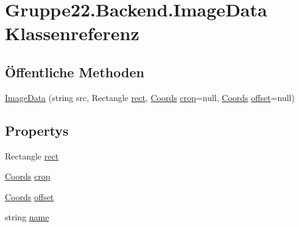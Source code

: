 \hypertarget{class_gruppe22_1_1_backend_1_1_image_data}{\section{Gruppe22.\-Backend.\-Image\-Data Klassenreferenz}
\label{class_gruppe22_1_1_backend_1_1_image_data}
}
\subsection*{Öffentliche Methoden}
\begin{DoxyCompactItemize}
\item 
\hyperlink{class_gruppe22_1_1_backend_1_1_image_data_a41d80114382a99b6833d750f28e51c43}{Image\-Data} (string src, Rectangle \hyperlink{class_gruppe22_1_1_backend_1_1_image_data_a75fd8821ff6ae1e7febb0489b0ae8104}{rect}, \hyperlink{class_gruppe22_1_1_backend_1_1_coords}{Coords} \hyperlink{class_gruppe22_1_1_backend_1_1_image_data_a8733f1a02de87502a6fef2453b435f64}{crop}=null, \hyperlink{class_gruppe22_1_1_backend_1_1_coords}{Coords} \hyperlink{class_gruppe22_1_1_backend_1_1_image_data_a5fd4e2478cb4b225d30ae74fe08e77b3}{offset}=null)
\end{DoxyCompactItemize}
\subsection*{Propertys}
\begin{DoxyCompactItemize}
\item 
Rectangle \hyperlink{class_gruppe22_1_1_backend_1_1_image_data_a75fd8821ff6ae1e7febb0489b0ae8104}{rect}
\item 
\hyperlink{class_gruppe22_1_1_backend_1_1_coords}{Coords} \hyperlink{class_gruppe22_1_1_backend_1_1_image_data_a8733f1a02de87502a6fef2453b435f64}{crop}
\item 
\hyperlink{class_gruppe22_1_1_backend_1_1_coords}{Coords} \hyperlink{class_gruppe22_1_1_backend_1_1_image_data_a5fd4e2478cb4b225d30ae74fe08e77b3}{offset}
\item 
string \hyperlink{class_gruppe22_1_1_backend_1_1_image_data_aaa0851a204433a44a73e5dd7ed175538}{name}
\end{DoxyCompactItemize}


